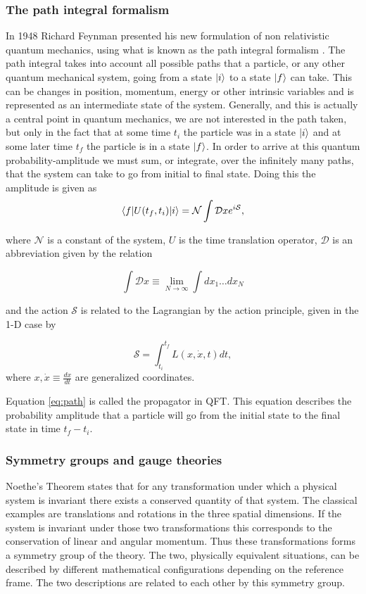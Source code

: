 \subsubsection{The path integral formalism}
In 1948 Richard Feynman presented his new formulation of non relativistic quantum mechanics, using what is known as the path integral formalism \cite{feynman1948sta}. The path integral takes into account all possible paths that a particle, or any other quantum mechanical system, going from a state $|i \rangle$ to a state $|f \rangle$ can take. This can be changes in position, momentum, energy or other intrinsic variables and is represented as an intermediate state of the system. Generally, and this is actually a central point in quantum mechanics, we are not interested in the path taken, but only in the fact that at some time $t_{i}$ the particle was in a state $|i \rangle$ and at some later time $t_{f}$ the particle is in a state $|f \rangle$. In order to arrive at this quantum probability-amplitude we must sum, or integrate, over the infinitely many paths, that the system can take to go from initial to final state. Doing this the amplitude is given as  
\begin{equation} \label{eq:path}
	\langle f| U(t_f,t_i) |i \rangle = \mathcal{N} \int \mathcal{D}x e^{i\mathcal{S}},
\end{equation}

where $\mathcal{N}$ is a constant of the system, $U$ is the time translation operator, $\mathcal{D}$ is an abbreviation given by the relation 

\begin{equation}
	\int \mathcal{D} x \equiv \lim_{N \to \infty} \int dx_1 \dots dx_N
\end{equation}

and the action $\mathcal{S}$ is related to the Lagrangian by the action principle, given in the 1-D case by

\begin{equation}
	\mathcal{S} = \int_{t_i}^{t_f} L(x,\dot{x},t)dt,
\end{equation}
where $x, \dot{x} \equiv \frac{dx}{dt}$ are generalized coordinates.

Equation \eqref{eq:path} is called the propagator in QFT. This equation describes the probability amplitude that a particle will go from the initial state to the final state in time $t_f - t_i$.

\subsubsection{Symmetry groups and gauge theories}
Noethe's Theorem states that for any transformation under which a physical system is invariant there exists a conserved quantity of that system. The classical examples are translations and rotations in the three spatial dimensions. If the system is invariant under those two transformations this corresponds to the conservation of linear and angular momentum. Thus these transformations forms a symmetry group of the theory. The two, physically equivalent situations, can be described by different mathematical configurations depending on the reference frame. The two descriptions are related to each other by this symmetry group.

